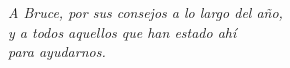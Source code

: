 \hbox{}\newpage
{}


\begin{flushright}
{\em A Bruce, por sus consejos a lo largo del año,\\
y a todos aquellos que han estado ahí\\
para ayudarnos.}
\end{flushright}